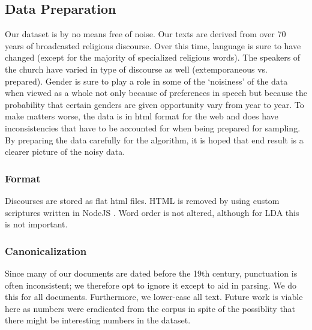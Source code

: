 \subsection{Data Preparation}
Our dataset is by no means free of noise. Our texts are derived from over 70 years of broadcasted religious discourse. Over this time, language is sure to have changed (except for the majority of specialized religious words). The speakers of the church have varied in type of discourse as well (extemporaneous vs. prepared). Gender is sure to play a role in some of the `noisiness' of the data when viewed as a whole not only because of preferences in speech but because the probability that certain genders are given opportunity vary from year to year. To make matters worse, the data is in html format for the web and does have inconsistencies that have to be accounted for when being prepared for sampling. By preparing the data carefully for the algorithm, it is hoped that end result is a clearer picture of the noisy data. 





\subsubsection{Format}
Discourses are stored as flat html files. HTML is removed by using custom scriptures written in NodeJS \cite{nodeJS}. Word order is not altered, although for LDA this is not important.%

\subsubsection{Canonicalization}
Since many of our documents are dated before the 19th century, punctuation is often inconsistent; we therefore opt to ignore it except to aid in parsing. We do this for all documents. Furthermore, we lower-case all text. Future work is viable here as numbers were eradicated from the corpus in spite of the possiblity that there might be interesting numbers in the dataset. 

